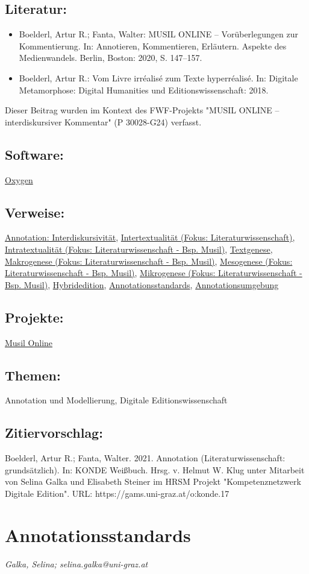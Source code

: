 \documentclass{article}
\begin{document}
        \subsection*{Literatur:}\begin{itemize}\item Boelderl, Artur R.; Fanta, Walter: MUSIL ONLINE – Vorüberlegungen zur Kommentierung. In: Annotieren, Kommentieren, Erläutern. Aspekte des Medienwandels. Berlin, Boston: 2020, S. 147–157.\item Boelderl, Artur R.: Vom Livre irréalisé zum Texte hyperréalisé. In: Digitale Metamorphose: Digital Humanities und Editionswissenschaft: 2018.\end{itemize}Dieser Beitrag wurden im Kontext des FWF-Projekts "MUSIL ONLINE – interdiskursiver Kommentar" 
                  (P 30028-G24) verfasst.\subsection*{Software:}\href{http://oxygenxml.com/}{Oxygen}\subsection*{Verweise:}\href{https://gams.uni-graz.at/o:konde.19}{Annotation: Interdiskursivität}, \href{https://gams.uni-graz.at/o:konde.20}{Intertextualität (Fokus: Literaturwissenschaft)}, \href{https://gams.uni-graz.at/o:konde.21}{Intratextualität (Fokus: Literaturwissenschaft - Bsp. Musil)}, \href{https://gams.uni-graz.at/o:konde.28}{Textgenese}, \href{https://gams.uni-graz.at/o:konde.23}{Makrogenese (Fokus: Literaturwissenschaft - Bsp. Musil)}, \href{https://gams.uni-graz.at/o:konde.24}{Mesogenese (Fokus: Literaturwissenschaft - Bsp. Musil)}, \href{https://gams.uni-graz.at/o:konde.26}{Mikrogenese (Fokus: Literaturwissenschaft - Bsp. Musil)}, \href{https://gams.uni-graz.at/o:konde.96}{Hybridedition}, \href{https://gams.uni-graz.at/o:konde.29}{Annotationsstandards}, \href{https://gams.uni-graz.at/o:konde.30}{Annotationsumgebung}\subsection*{Projekte:}\href{http://musilonline.at}{Musil Online}\subsection*{Themen:}Annotation und Modellierung, Digitale Editionswissenschaft\subsection*{Zitiervorschlag:}Boelderl, Artur R.; Fanta, Walter. 2021. Annotation (Literaturwissenschaft: grundsätzlich). In: KONDE Weißbuch. Hrsg. v. Helmut W. Klug unter Mitarbeit von Selina Galka und Elisabeth Steiner im HRSM Projekt "Kompetenznetzwerk Digitale Edition". URL: https://gams.uni-graz.at/o:konde.17\newpage\section*{Annotationsstandards} \emph{Galka, Selina; selina.galka@uni-graz.at }\\
        
\end{document}
